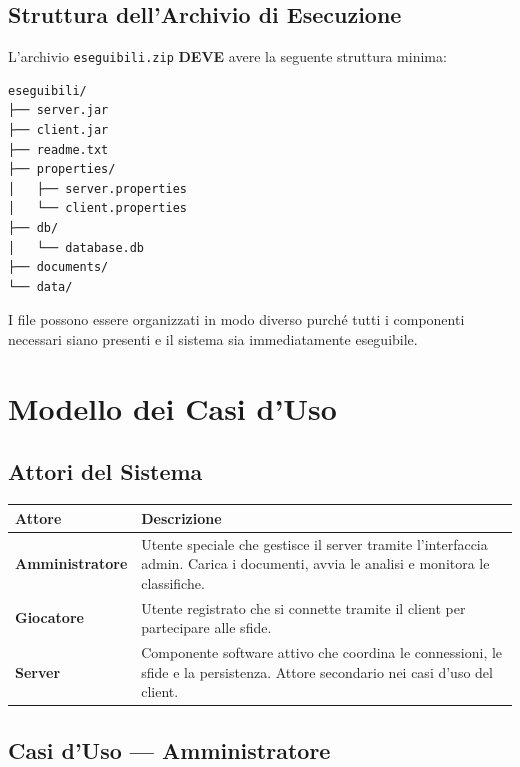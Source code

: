 \documentclass[12pt, a4paper]{article}
\newcommand{\mustshall}{\textbf{DEVE}}
\newcommand{\code}[1]{\texttt{#1}}
\begin{document}
\subsection{Struttura dell'Archivio di Esecuzione}

L'archivio \code{eseguibili.zip} \mustshall{} avere la seguente struttura minima:

\begin{lstlisting}[language={}]
eseguibili/
├── server.jar
├── client.jar
├── readme.txt
├── properties/
│   ├── server.properties
│   └── client.properties
├── db/
│   └── database.db
├── documents/
└── data/
\end{lstlisting}

I file possono essere organizzati in modo diverso purché tutti i componenti necessari siano presenti e il sistema sia immediatamente eseguibile.

\newpage
\section{Modello dei Casi d'Uso}

\subsection{Attori del Sistema}

\begin{longtable}{|p{3cm}|p{10cm}|}
    \hline
    \rowcolor{primaryBlue!20}
    \textbf{Attore} & \textbf{Descrizione} \\
    \hline
    \endhead
    \textbf{Amministratore} & Utente speciale che gestisce il server tramite l'interfaccia admin. Carica i documenti, avvia le analisi e monitora le classifiche. \\
    \hline
    \textbf{Giocatore} & Utente registrato che si connette tramite il client per partecipare alle sfide. \\
    \hline
    \textbf{Server} & Componente software attivo che coordina le connessioni, le sfide e la persistenza. Attore secondario nei casi d'uso del client. \\
    \hline
\end{longtable}

\subsection{Casi d'Uso — Amministratore}
\end{document}
